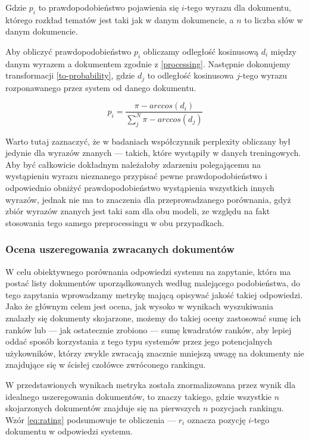 \documentclass[11pt,a4paper]{article}
\begin{document}
\noindent
Gdzie $p_i$ to prawdopodobieństwo pojawienia się $i$-tego wyrazu dla dokumentu,
którego rozkład tematów jest taki jak w danym dokumencie, a $n$ to liczba słów
w danym dokumencie.

Aby obliczyć prawdopodobieństwo $p_i$ obliczamy odległość kosinusową $d_i$
między danym wyrazem a dokumentem zgodnie z \ref{processing}. Następnie
dokonujemy transformacji \ref{to-probability}, gdzie $d_j$ to odległość
kosinusowa $j$-tego wyrazu rozponawanego przez system od danego dokumentu.

\begin{equation}
  \label{to-probability}
  p_i = \frac{\pi - arccos(d_i)}{\sum_j^N \pi - arccos(d_j)}
\end{equation}

Warto tutaj zaznaczyć, że w badaniach współczynnik perplexity obliczany był
jedynie dla wyrazów znanych --- takich, które wystąpiły w danych treningowych.
Aby być całkowicie dokładnym należałoby zdarzeniu polegającemu na wystąpieniu
wyrazu nieznanego przypisać pewne prawdopodobieństwo i odpowiednio obniżyć
prawdopodobieństwo wystąpienia wszystkich innych wyrazów, jednak nie ma to
znaczenia dla przeprowadzanego porównania, gdyż zbiór wyrazów znanych jest taki
sam dla obu modeli, ze względu na fakt stosowania tego samego preprocessingu w
obu przypadkach.

\subsubsection{Ocena uszeregowania zwracanych dokumentów}
\label{sec:ranking}

W celu obiektywnego porównania odpowiedzi systemu na zapytanie, która ma postać
listy dokumentów uporządkowanych według malejącego podobieństwa, do tego
zapytania wprowadzamy metrykę mającą opisywać jakość takiej odpowiedzi. Jako że
głównym celem jest ocena, jak wysoko w wynikach wyszukiwania znalazły się
dokumenty skojarzone, możemy do takiej oceny zastosować sumę ich ranków lub ---
jak ostatecznie zrobiono --- sumę kwadratów ranków, aby lepiej oddać sposób
korzystania z tego typu systemów przez jego potencjalnych użykowników, którzy
zwykle zwracają znacznie mniejszą uwagę na dokumenty nie znajdujące się w
ścisłej czołówce zwróconego rankingu.

W przedstawionych wynikach metryka została znormalizowana przez wynik dla
idealnego uszeregowania dokumentów, to znaczy takiego, gdzie wszystkie $n$
skojarzonych dokumentów znajduje się na pierwszych $n$ pozycjach rankingu. Wzór
\ref{eq:rating} podsumowuje te obliczenia --- $r_i$ oznacza pozycję $i$-tego
dokumentu w odpowiedzi systemu.
\end{document}
